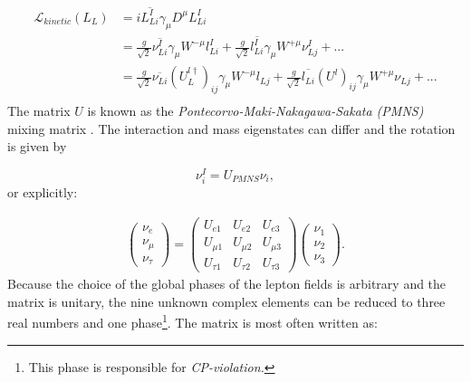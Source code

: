 \begin{equation}
\begin{split}
\mathcal{L}_{kinetic}\left(L_L\right) &= i\overline{L^I_{Li}}\gamma_\mu D^\mu L^I_{Li} \\
&= \frac{g}{\sqrt{2}}\overline{\nu^I_{Li}} \gamma_\mu W^{-\mu} l^I_{Li} + \frac{g}{\sqrt{2}} \overline{l^I_{Li}} \gamma_\mu W^{+\mu} \nu^I_{Lj} + ...\\
&= \frac{g}{\sqrt{2}}\overline{\nu_{Li}} \left(U^{l\dagger}_L\right)_{ij} \gamma_\mu W^{-\mu} l_{Lj} + \frac{g}{\sqrt{2}} \overline{l_{Li}} \left(U^l\right)_{ij} \gamma_\mu W^{+\mu} \nu_{Lj} + ...\\
\end{split}
\end{equation}
The matrix $U$ is known as the \textit{Pontecorvo-Maki-Nakagawa-Sakata (PMNS)} mixing matrix \cite{doi:10.1143/PTP.28.870}. The interaction and mass eigenstates can differ and the rotation is given by

\begin{equation}
\nu^I_i = U_{PMNS} \nu_i,
\end{equation}
or explicitly:


\begin{equation}
\begin{split}
\begin{pmatrix} \nu_e \\ \nu_\mu \\ \nu_\tau \end{pmatrix} = 
\begin{pmatrix} 
U_{e1} & U_{e2} & U_{e3} \\
U_{\mu 1} & U_{\mu 2} & U_{\mu 3} \\
U_{\tau 1} & U_{\tau 2} & U_{\tau 3}
\end{pmatrix}
\begin{pmatrix} \nu_1 \\ \nu_2 \\ \nu_3 \end{pmatrix}.
\end{split}
\end{equation}
Because the choice of the global phases of the lepton fields is arbitrary and the matrix is unitary, the nine unknown complex elements can be reduced to three real numbers and one phase\footnote{This phase is responsible for \textit{CP-violation.}}. The matrix is most often written as:

